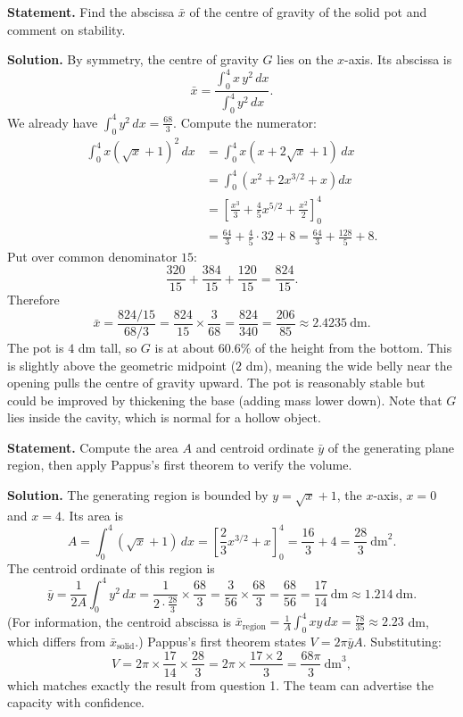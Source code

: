 \documentclass[11pt]{article}
\begin{document}
\begin{exoresolu}
\noindent\textbf{Statement.} Find the abscissa $\bar{x}$ of the centre of gravity of the solid pot and comment on stability.

\noindent\textbf{Solution.}
By symmetry, the centre of gravity $G$ lies on the $x$-axis. Its abscissa is
\[ \bar{x} = \frac{\int_0^4 x\,y^2\,dx}{\int_0^4 y^2\,dx}. \]
We already have $\int_0^4 y^2\,dx = \frac{68}{3}$. Compute the numerator:
\begin{align*}
\int_0^4 x(\sqrt{x}+1)^2\,dx &= \int_0^4 x(x + 2\sqrt{x} + 1)\,dx \\
&= \int_0^4 \left(x^2 + 2x^{3/2} + x\right)dx \\
&= \left[ \frac{x^3}{3} + \frac{4}{5}x^{5/2} + \frac{x^2}{2} \right]_0^4 \\
&= \frac{64}{3} + \frac{4}{5}\cdot 32 + 8 = \frac{64}{3} + \frac{128}{5} + 8.
\end{align*}
Put over common denominator $15$:
\[ \frac{320}{15} + \frac{384}{15} + \frac{120}{15} = \frac{824}{15}. \]
Therefore
\[ \bar{x} = \frac{824/15}{68/3} = \frac{824}{15}\times\frac{3}{68} = \frac{824}{340} = \frac{206}{85} \approx 2.4235\ \mathrm{dm}. \]
The pot is $4$ dm tall, so $G$ is at about $60.6\%$ of the height from the bottom. This is slightly above the geometric midpoint ($2$ dm), meaning the wide belly near the opening pulls the centre of gravity upward. The pot is reasonably stable but could be improved by thickening the base (adding mass lower down). Note that $G$ lies inside the cavity, which is normal for a hollow object.
\end{exoresolu}

\begin{exoresolu}
\noindent\textbf{Statement.} Compute the area $A$ and centroid ordinate $\bar{y}$ of the generating plane region, then apply Pappus's first theorem to verify the volume.

\noindent\textbf{Solution.}
The generating region is bounded by $y=\sqrt{x}+1$, the $x$-axis, $x=0$ and $x=4$. Its area is
\[ A = \int_0^4 (\sqrt{x}+1)\,dx = \left[ \frac{2}{3}x^{3/2} + x \right]_0^4 = \frac{16}{3} + 4 = \frac{28}{3}\ \mathrm{dm}^2. \]
The centroid ordinate of this region is
\[ \bar{y} = \frac{1}{2A}\int_0^4 y^2\,dx = \frac{1}{2\cdot\frac{28}{3}}\times\frac{68}{3} = \frac{3}{56}\times\frac{68}{3} = \frac{68}{56} = \frac{17}{14}\ \mathrm{dm} \approx 1.214\ \mathrm{dm}. \]
(For information, the centroid abscissa is $\bar{x}_{\text{region}} = \frac{1}{A}\int_0^4 x y\,dx = \frac{78}{35}\approx 2.23$ dm, which differs from $\bar{x}_{\text{solid}}$.)
Pappus's first theorem states $V = 2\pi\bar{y}A$. Substituting:
\[ V = 2\pi \times \frac{17}{14} \times \frac{28}{3} = 2\pi \times \frac{17\times 2}{3} = \frac{68\pi}{3}\ \mathrm{dm}^3, \]
which matches exactly the result from question 1. The team can advertise the capacity with confidence.
\end{exoresolu}
\end{document}

